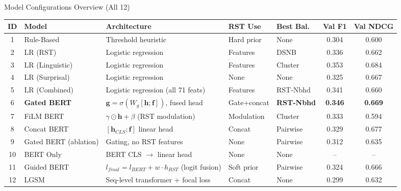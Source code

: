 \documentclass[aspectratio=169]{beamer}
\begin{document}
\begin{frame}{Model Configurations Overview (All 12)}
    \centering
    \tiny
    \begin{tabular}{c l l l l c c}
        \toprule
        \textbf{ID} & \textbf{Model} & \textbf{Architecture} & \textbf{RST Use} & \textbf{Best Bal.} & \textbf{Val F1} & \textbf{Val NDCG} \\
        \midrule
        1  & Rule-Based            & Threshold heuristic                                          & Hard prior  & None      & 0.304 & 0.600 \\
        2  & LR (RST)              & Logistic regression                                          & Features    & DSNB      & 0.336 & 0.662 \\
        3  & LR (Linguistic)       & Logistic regression                                          & Features    & Cluster   & 0.353 & 0.684 \\
        4  & LR (Surprisal)        & Logistic regression                                          & None        & None      & 0.325 & 0.667 \\
        5  & LR (Combined)         & Logistic regression (all 71 feats)                           & Features    & RST-Nbhd  & 0.341 & 0.660 \\
        6  & \textbf{Gated BERT}   & $\mathbf{g}=\sigma(W_g[\mathbf{h};\mathbf{f}])$, fused head  & Gate+concat & \textbf{RST-Nbhd} & \textbf{0.346} & \textbf{0.669} \\
        7  & FiLM BERT             & $\gamma \odot \mathbf{h} + \beta$ (RST modulation)           & Modulation  & Cluster   & 0.333 & 0.594 \\
        8  & Concat BERT           & $[\mathbf{h}_{CLS};\mathbf{f}]$ linear head                  & Concat      & Pairwise  & 0.329 & 0.677 \\
        9  & Gated BERT (ablation) & Gating, no RST features                                      & None        & Pairwise  & 0.312 & 0.635 \\
        10 & BERT Only             & BERT CLS $\rightarrow$ linear head                           & None        & None      & --    & --    \\
        11 & Guided BERT           & $l_{final}=l_{BERT}+w \cdot h_{RST}$ (logit fusion)          & Soft prior  & Pairwise  & 0.324 & 0.666 \\
        12 & LGSM                  & Seq-level transformer + focal loss                           & Concat      & None      & 0.299 & 0.632 \\

\end{tabular}
\end{frame}
\end{document}

